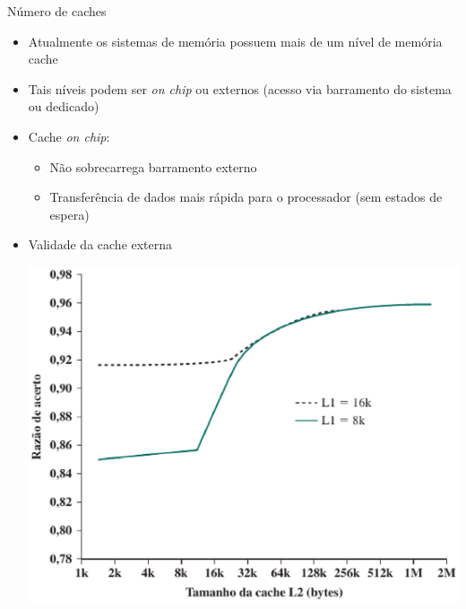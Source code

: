\begin{slide}{Número de caches}
	\twocolumn
	{
		\begin{itemize}
			\item Atualmente os sistemas de memória possuem mais de um nível de memória cache
			\item Tais níveis podem ser \emph{on chip} ou externos (acesso via barramento do sistema ou dedicado)
			\item Cache \emph{on chip}:
				\begin{itemize}
					\item Não sobrecarrega barramento externo
					\item Transferência de dados mais rápida para o processador (sem estados de espera)
				\end{itemize}
		\end{itemize}
	}
	{
		\begin{itemize}
			\item Validade da cache externa\\
			\begin{center}
				\includegraphics[width=\textwidth]{figs/acerto02}
			\end{center}
		\end{itemize}
	}
\end{slide}

